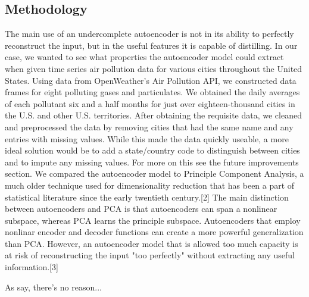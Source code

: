 \documentclass{article}
\begin{document}
\begin{multicols}{2}
\section{Methodology}
The main use of an undercomplete autoencoder is not in its ability to perfectly reconstruct the input, but in the useful features it is capable of distilling.
In our case, we wanted to see what properties the autoencoder model could extract when given time series air pollution data for various cities throughout the United States. Using data from OpenWeather's Air Pollution API, we constructed data frames for eight polluting gases and particulates. We obtained the daily averages of each pollutant six and a half months for just over eighteen-thousand cities in the U.S. and other U.S. territories.
After obtaining the requisite data, we cleaned and preprocessed the data by removing cities that had the same name and any entries with missing values. While this made the data quickly useable, a more ideal solution would be to add a state/country code to distinguish between cities and to impute any missing values. For more on this see the future improvements section.
We compared the autoencoder model to Principle Component Analysis, a much older technique used for dimensionality reduction that has been a part of statistical literature since the early twentieth century.[2] The main distinction between autoencoders and PCA is that autoencoders can span a nonlinear subspace, whereas PCA learns the principle subspace.
Autoencoders that employ nonlinar encoder and decoder functions can create a more powerful generalization than PCA. However, an autoencoder model that is allowed too much capacity is at risk of reconstructing the input "too perfectly" without extracting any useful information.[3]
\end{multicols}

As \textcite{Goodfellow16} say, there's no reason...
\textcite{Jolliffe02}
\textcite{NAAQS09}

\printbibliography
\end{document}
